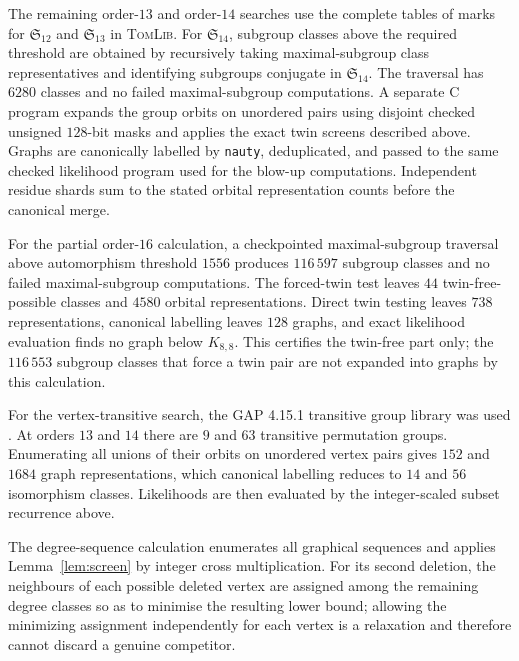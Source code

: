 \documentclass[11pt]{article}
\theoremstyle{definition}
\begin{document}
The remaining order-$13$ and order-$14$ searches use the complete tables of
marks for $\mathfrak S_{12}$ and $\mathfrak S_{13}$ in \textsc{TomLib}.  For
$\mathfrak S_{14}$, subgroup classes above the required threshold are obtained
by recursively taking maximal-subgroup class representatives and identifying
subgroups conjugate in $\mathfrak S_{14}$.  The traversal has $6280$ classes
and no failed maximal-subgroup computations.  A separate C program expands
the group orbits on unordered pairs using disjoint checked unsigned $128$-bit
masks and applies the exact twin screens described above.  Graphs are
canonically labelled by \texttt{nauty}, deduplicated, and passed to the same
checked likelihood program used for the blow-up computations.  Independent
residue shards sum to the stated orbital representation counts before the
canonical merge.

For the partial order-$16$ calculation, a checkpointed maximal-subgroup
traversal above automorphism threshold $1556$ produces $116\,597$ subgroup
classes and no failed maximal-subgroup computations.  The forced-twin test
leaves $44$ twin-free-possible classes and $4580$ orbital representations.
Direct twin testing leaves $738$ representations, canonical labelling leaves
$128$ graphs, and exact likelihood evaluation finds no graph below
$K_{8,8}$.  This certifies the twin-free part only; the $116\,553$ subgroup
classes that force a twin pair are not expanded into graphs by this
calculation.

For the vertex-transitive search, the GAP 4.15.1 transitive group library was
used \cite{GAP}.  At orders $13$ and $14$ there
are $9$ and $63$ transitive permutation groups.  Enumerating all unions of
their orbits on unordered vertex pairs gives $152$ and $1684$ graph
representations, which canonical labelling reduces to $14$ and $56$
isomorphism classes.  Likelihoods are then evaluated by the integer-scaled
subset recurrence above.

The degree-sequence calculation enumerates all graphical sequences and applies
Lemma~\ref{lem:screen} by integer cross multiplication.
For its second deletion, the neighbours of each possible deleted vertex are
assigned among the remaining degree classes so as to minimise the resulting
lower bound; allowing the minimizing assignment independently for each
vertex is a relaxation and therefore cannot discard a genuine competitor.
\end{document}
